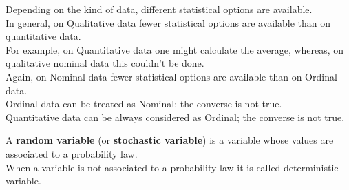 
\begin{frame}
  \vspace*{.15cm}
  Depending on the kind of data, different statistical options are available.\\
  \vspace*{.35cm}
  In general, on Qualitative data fewer statistical options are available than on quantitative data.\\
  \vspace*{.35cm}
  For example, on Quantitative data one might calculate the average, whereas, on qualitative nominal data this couldn't be done.\\ %
  \vspace*{.35cm}
  Again, on Nominal data fewer statistical options are available than on Ordinal data.\\
  \vspace*{.35cm}
  Ordinal data can be treated as Nominal; the converse is not true.\\
  \vspace*{.35cm}
  Quantitative data can be always considered as Ordinal; the converse is not true.\\
\end{frame}

\begin{frame}
  \vspace{1.25cm}
  A \textbf{random variable} (or \textbf{stochastic variable}) is a variable whose values are associated to a probability law.\\
  \vspace{0.75cm}
  When a variable is not associated to a probability law it is called deterministic variable. \\
\end{frame}

